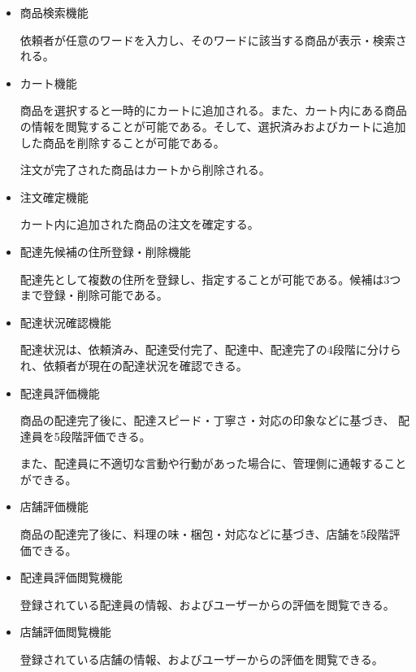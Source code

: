 \begin{itemize}
\begin{itemize}
        \item 商品検索機能
        
        依頼者が任意のワードを入力し、そのワードに該当する商品が表示・検索される。

        \item カート機能

        商品を選択すると一時的にカートに追加される。また、カート内にある商品の情報を閲覧することが可能である。そして、選択済みおよびカートに追加した商品を削除することが可能である。

        注文が完了された商品はカートから削除される。

        
        \item 注文確定機能
        
        カート内に追加された商品の注文を確定する。
        
        \item 配達先候補の住所登録・削除機能
        
        配達先として複数の住所を登録し、指定することが可能である。候補は3つまで登録・削除可能である。
        \item 配達状況確認機能
        
        配達状況は、依頼済み、配達受付完了、配達中、配達完了の4段階に分けられ、依頼者が現在の配達状況を確認できる。

        \item 配達員評価機能
        
        商品の配達完了後に、配達スピード・丁寧さ・対応の印象などに基づき、 配達員を5段階評価できる。

        また、配達員に不適切な言動や行動があった場合に、管理側に通報することができる。

        \item 店舗評価機能
        
        商品の配達完了後に、料理の味・梱包・対応などに基づき、店舗を5段階評価できる。
        
        \item 配達員評価閲覧機能 
        
        登録されている配達員の情報、およびユーザーからの評価を閲覧できる。

        \item 店舗評価閲覧機能 
        
        登録されている店舗の情報、およびユーザーからの評価を閲覧できる。 
    \end{itemize}
  
\end{itemize}



